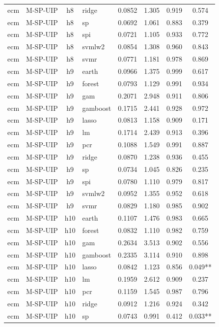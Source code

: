 \begin{ThreePartTable}
\begin{longtable}[t]{llclcccc}
ecm & M-SP-UIP & h8 & ridge & 0.0852 & 1.305 & 0.919 & 0.574\\
ecm & M-SP-UIP & h8 & sp & 0.0692 & 1.061 & 0.883 & 0.379\\
ecm & M-SP-UIP & h8 & spi & 0.0721 & 1.105 & 0.933 & 0.772\\
ecm & M-SP-UIP & h8 & svmlw2 & 0.0854 & 1.308 & 0.960 & 0.843\\
ecm & M-SP-UIP & h8 & svmr & 0.0771 & 1.181 & 0.978 & 0.869\\
\addlinespace
ecm & M-SP-UIP & h9 & earth & 0.0966 & 1.375 & 0.999 & 0.617\\
ecm & M-SP-UIP & h9 & forest & 0.0793 & 1.129 & 0.991 & 0.934\\
ecm & M-SP-UIP & h9 & gam & 0.2071 & 2.948 & 0.911 & 0.806\\
ecm & M-SP-UIP & h9 & gamboost & 0.1715 & 2.441 & 0.928 & 0.972\\
ecm & M-SP-UIP & h9 & lasso & 0.0813 & 1.158 & 0.909 & 0.171\\
ecm & M-SP-UIP & h9 & lm & 0.1714 & 2.439 & 0.913 & 0.396\\
ecm & M-SP-UIP & h9 & pcr & 0.1088 & 1.549 & 0.991 & 0.887\\
ecm & M-SP-UIP & h9 & ridge & 0.0870 & 1.238 & 0.936 & 0.455\\
ecm & M-SP-UIP & h9 & sp & 0.0734 & 1.045 & 0.826 & 0.235\\
ecm & M-SP-UIP & h9 & spi & 0.0780 & 1.110 & 0.979 & 0.817\\
ecm & M-SP-UIP & h9 & svmlw2 & 0.0952 & 1.355 & 0.952 & 0.618\\
ecm & M-SP-UIP & h9 & svmr & 0.0829 & 1.180 & 0.985 & 0.902\\
\addlinespace
ecm & M-SP-UIP & h10 & earth & 0.1107 & 1.476 & 0.983 & 0.665\\
ecm & M-SP-UIP & h10 & forest & 0.0832 & 1.110 & 0.982 & 0.759\\
ecm & M-SP-UIP & h10 & gam & 0.2634 & 3.513 & 0.902 & 0.556\\
ecm & M-SP-UIP & h10 & gamboost & 0.2335 & 3.114 & 0.910 & 0.898\\
ecm & M-SP-UIP & h10 & lasso & 0.0842 & 1.123 & 0.856 & 0.049**\\
ecm & M-SP-UIP & h10 & lm & 0.1959 & 2.612 & 0.909 & 0.237\\
ecm & M-SP-UIP & h10 & pcr & 0.1159 & 1.545 & 0.987 & 0.796\\
ecm & M-SP-UIP & h10 & ridge & 0.0912 & 1.216 & 0.924 & 0.342\\
ecm & M-SP-UIP & h10 & sp & 0.0743 & 0.991 & 0.412 & 0.033**\\

\end{longtable}
\end{ThreePartTable}
